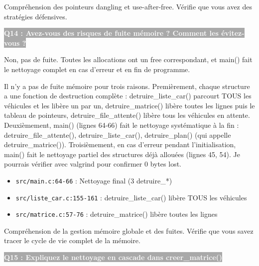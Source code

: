 \documentclass[12pt,a4paper]{article}
\newcommand{\question}[1]{%
    \vspace{0.5cm}
    \noindent\colorbox{darkgray}{\textcolor{white}{\textbf{#1}}}
    \vspace{0.3cm}
}
\begin{document}
\begin{objectif_prof}
Compréhension des pointeurs dangling et use-after-free. Vérifie que vous avez des stratégies défensives.
\end{objectif_prof}

\question{Q14 : Avez-vous des risques de fuite mémoire ? Comment les évitez-vous ?}

\begin{reponse_courte}
Non, pas de fuite. Toutes les allocations ont un free correspondant, et main() fait le nettoyage complet en cas d'erreur et en fin de programme.
\end{reponse_courte}

\begin{reponse_longue}
Il n'y a pas de fuite mémoire pour trois raisons. Premièrement, chaque structure a une fonction de destruction complète : detruire\_liste\_car() parcourt TOUS les véhicules et les libère un par un, detruire\_matrice() libère toutes les lignes puis le tableau de pointeurs, detruire\_file\_attente() libère tous les véhicules en attente. Deuxièmement, main() (lignes 64-66) fait le nettoyage systématique à la fin : detruire\_file\_attente(), detruire\_liste\_car(), detruire\_plan() (qui appelle detruire\_matrice()). Troisièmement, en cas d'erreur pendant l'initialisation, main() fait le nettoyage partiel des structures déjà allouées (lignes 45, 54). Je pourrais vérifier avec valgrind pour confirmer 0 bytes lost.
\end{reponse_longue}

\begin{reference_code}
\begin{itemize}
    \item \texttt{src/main.c:64-66} : Nettoyage final (3 detruire\_*)
    \item \texttt{src/liste\_car.c:155-161} : detruire\_liste\_car() libère TOUS les véhicules
    \item \texttt{src/matrice.c:57-76} : detruire\_matrice() libère toutes les lignes
\end{itemize}
\end{reference_code}

\begin{objectif_prof}
Compréhension de la gestion mémoire globale et des fuites. Vérifie que vous savez tracer le cycle de vie complet de la mémoire.
\end{objectif_prof}

\question{Q15 : Expliquez le nettoyage en cascade dans creer\_matrice()}
\end{document}
